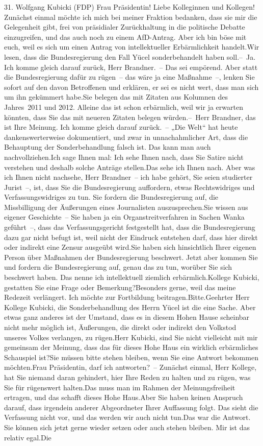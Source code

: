 \documentclass{article}
\begin{document}
	31. Wolfgang Kubicki (FDP) Frau Präsidentin! Liebe Kolleginnen und Kollegen! Zunächst einmal möchte ich mich bei meiner Fraktion bedanken, dass sie mir die Gelegenheit gibt, frei von präsidialer Zurückhaltung in die politische Debatte einzugreifen, und das auch noch zu einem AfD-Antrag. Aber ich bin böse mit euch, weil es sich um einen Antrag von intellektueller Erbärmlichkeit handelt.Wir lesen, dass die Bundesregierung den Fall Yücel sonderbehandelt haben soll.– Ja. Ich komme gleich darauf zurück, Herr Brandner. – Das sei empörend. Aber statt die Bundesregierung dafür zu rügen – das wäre ja eine Maßnahme –, lenken Sie sofort auf den davon Betroffenen und erklären, er sei es nicht wert, dass man sich um ihn gekümmert habe.Sie belegen das mit Zitaten aus Kolumnen des Jahres 2011 und 2012. Alleine das ist schon erbärmlich, weil wir ja erwarten könnten, dass Sie das mit neueren Zitaten belegen würden.– Herr Brandner, das ist Ihre Meinung. Ich komme gleich darauf zurück. – „Die Welt“ hat heute dankenswerterweise dokumentiert, und zwar in unnachahmlicher Art, dass die Behauptung der Sonderbehandlung falsch ist. Das kann man auch nachvollziehen.Ich sage Ihnen mal: Ich sehe Ihnen nach, dass Sie Satire nicht verstehen und deshalb solche Anträge stellen.Das sehe ich Ihnen nach. Aber was ich Ihnen nicht nachsehe, Herr Brandner – ich habe gehört, Sie seien studierter Jurist –, ist, dass Sie die Bundesregierung auffordern, etwas Rechtswidriges und Verfassungswidriges zu tun. Sie fordern die Bundesregierung auf, die Missbilligung der Äußerungen eines Journalisten auszusprechen.Sie wissen aus eigener Geschichte – Sie haben ja ein Organstreitverfahren in Sachen Wanka geführt –, dass das Verfassungsgericht festgestellt hat, dass die Bundesregierung dazu gar nicht befugt ist, weil nicht der Eindruck entstehen darf, dass hier direkt oder indirekt eine Zensur ausgeübt wird.Sie haben sich hinsichtlich Ihrer eigenen Person über Maßnahmen der Bundesregierung beschwert. Jetzt aber kommen Sie und fordern die Bundesregierung auf, genau das zu tun, worüber Sie sich beschwert haben. Das nenne ich intellektuell ziemlich erbärmlich.Kollege Kubicki, gestatten Sie eine Frage oder Bemerkung?Besonders gerne, weil das meine Redezeit verlängert. Ich möchte zur Fortbildung beitragen.Bitte.Geehrter Herr Kollege Kubicki, die Sonderbehandlung des Herrn Yücel ist die eine Sache. Aber etwas ganz anderes ist der Umstand, dass es in diesem Hohen Hause scheinbar nicht mehr möglich ist, Äußerungen, die direkt oder indirekt den Volkstod unseres Volkes verlangen, zu rügen.Herr Kubicki, sind Sie nicht vielleicht mit mir gemeinsam der Meinung, dass das für dieses Hohe Haus ein wirklich erbärmliches Schauspiel ist?Sie müssen bitte stehen bleiben, wenn Sie eine Antwort bekommen möchten.Frau Präsidentin, darf ich antworten? – Zunächst einmal, Herr Kollege, hat Sie niemand daran gehindert, hier Ihre Reden zu halten und zu rügen, was Sie für rügenswert halten.Das muss man im Rahmen der Meinungsfreiheit ertragen, und das schafft dieses Hohe Haus.Aber Sie haben keinen Anspruch darauf, dass irgendein anderer Abgeordneter Ihrer Auffassung folgt. Das sieht die Verfassung nicht vor, und das werden wir auch nicht tun.Das war die Antwort. Sie können sich jetzt gerne wieder setzen oder auch stehen bleiben. Mir ist das relativ egal.Die 
\end{document}
